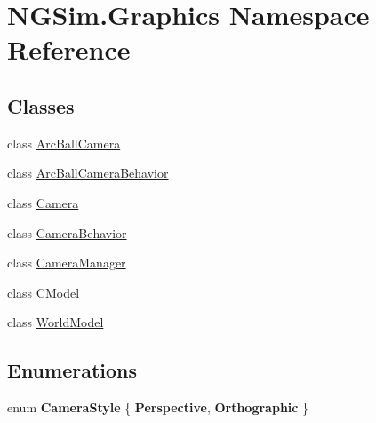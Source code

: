 \hypertarget{namespace_n_g_sim_1_1_graphics}{}\section{N\+G\+Sim.\+Graphics Namespace Reference}
\label{namespace_n_g_sim_1_1_graphics}
\subsection*{Classes}
\begin{DoxyCompactItemize}
\item 
class \hyperlink{class_n_g_sim_1_1_graphics_1_1_arc_ball_camera}{Arc\+Ball\+Camera}
\item 
class \hyperlink{class_n_g_sim_1_1_graphics_1_1_arc_ball_camera_behavior}{Arc\+Ball\+Camera\+Behavior}
\item 
class \hyperlink{class_n_g_sim_1_1_graphics_1_1_camera}{Camera}
\item 
class \hyperlink{class_n_g_sim_1_1_graphics_1_1_camera_behavior}{Camera\+Behavior}
\item 
class \hyperlink{class_n_g_sim_1_1_graphics_1_1_camera_manager}{Camera\+Manager}
\item 
class \hyperlink{class_n_g_sim_1_1_graphics_1_1_c_model}{C\+Model}
\item 
class \hyperlink{class_n_g_sim_1_1_graphics_1_1_world_model}{World\+Model}
\end{DoxyCompactItemize}
\subsection*{Enumerations}
\begin{DoxyCompactItemize}
\item 
\mbox{\label{namespace_n_g_sim_1_1_graphics_af66ebd727dac7d64ab6080713ecec6c5}} 
enum {\bfseries Camera\+Style} \{ {\bfseries Perspective}, 
{\bfseries Orthographic}
 \}
\end{DoxyCompactItemize}

